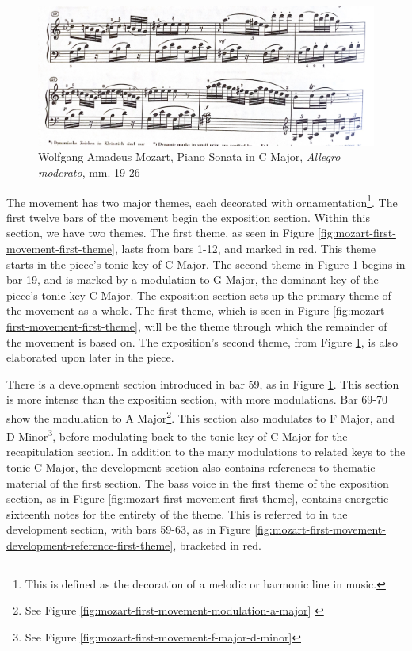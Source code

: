 \begin{figure}
    \centering
    \includegraphics[width=\textwidth]{figures/mozart-first-movement-second-theme.jpg}
    \caption{Wolfgang Amadeus Mozart, Piano Sonata in C Major, \textit{Allegro moderato}, mm. 19-26}
    \label{fig:mozart-first-movement-second-theme}
\end{figure}

The movement has two major themes, each decorated with ornamentation\footnote{This is defined as the decoration of a melodic or harmonic line in music.}\autocite{Latham_2011a}\autocite{Burkholder_Grout_Palisca_2014}. The first twelve bars of the movement begin the exposition section. Within this section, we have two themes. The first theme, as seen in Figure \ref{fig:mozart-first-movement-first-theme}\autocite{Henle_1977}, lasts from bars 1-12, and marked in red. This theme starts in the piece's tonic key of C Major. The second theme in Figure \ref{fig:mozart-first-movement-second-theme}\autocite{Henle_1977} begins in bar 19, and is marked by a modulation to G Major, the dominant key of the piece's tonic key C Major. The exposition section sets up the primary theme of the movement as a whole. The first theme, which is seen in Figure \ref{fig:mozart-first-movement-first-theme}\autocite{Henle_1977}, will be the theme through which the remainder of the movement is based on. The exposition's second theme, from Figure \ref{fig:mozart-first-movement-second-theme}\autocite{Henle_1977}, is also elaborated upon later in the piece. 

There is a development section introduced in bar 59, as in Figure \ref{fig:mozart-first-movement-second-theme}\autocite{Henle_1977}. This section is more intense than the exposition section, with more modulations. Bar 69-70 show the modulation to A Major\footnote{See Figure \ref{fig:mozart-first-movement-modulation-a-major} \autocite{Henle_1977}}. This section also modulates to F Major, and D Minor\footnote{See Figure \ref{fig:mozart-first-movement-f-major-d-minor}}\autocite{Henle_1977}, before modulating back to the tonic key of C Major for the recapitulation section. In addition to the many modulations to related keys to the tonic C Major, the development section also contains references to thematic material of the first section. The bass voice in the first theme of the exposition section, as in Figure \ref{fig:mozart-first-movement-first-theme}\autocite{Henle_1977}, contains energetic sixteenth notes for the entirety of the theme. This is referred to in the development section, with bars 59-63, as in Figure \ref{fig:mozart-first-movement-development-reference-first-theme}\autocite{Henle_1977}, bracketed in red. 


